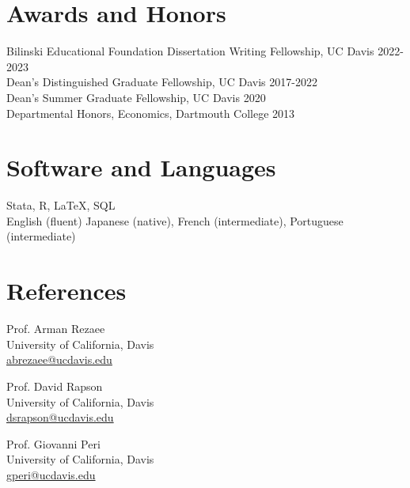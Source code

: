 \documentclass[10pt]{res} %
\begin{document}
\begin{resume}
		\section{Awards and Honors} 
		Bilinski Educational Foundation Dissertation Writing Fellowship, UC Davis   \hfill 2022-2023  \\
		Dean's Distinguished Graduate Fellowship, UC Davis \hfill 2017-2022  \\
		Dean's Summer Graduate Fellowship, UC Davis \hfill 2020 \\
		Departmental Honors, Economics, Dartmouth College \hfill 2013 
		
		
		
		\section{Software and Languages}
		Stata, R, \LaTeX, SQL \\
		English (fluent) Japanese (native), French (intermediate), Portuguese (intermediate)
		
		
		
		\section{References}
		\begin{multicols}{2}
			
			Prof. Arman Rezaee \\
			University of California, Davis \\
			\href{mailto:}{abrezaee@ucdavis.edu}
			
			
			\vfill\columnbreak
			
			Prof. David Rapson  \\
			University of California, Davis \\
			\href{mailto:}{dsrapson@ucdavis.edu}
			
		\end{multicols}
		
		Prof. Giovanni Peri  \\
		University of California, Davis \\
		\href{mailto:}{gperi@ucdavis.edu }
		
		
		
	\end{resume} 
\end{document}
